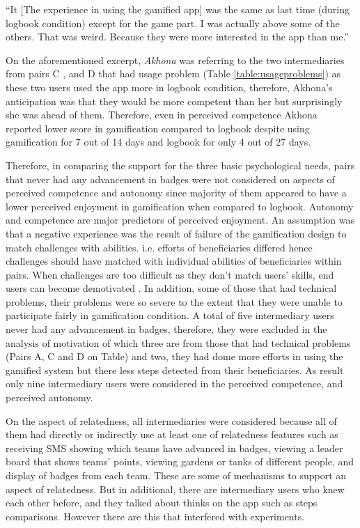  {``It [The experience in using the gamified app] was the same as last time (during logbook condition) except for the game part. I was actually above some of the others. That was weird. Because they were more interested in the app than me.''} 

On the aforementioned excerpt, \emph{Akhona} was referring to the two intermediaries from pairs C , and D that had usage problem (Table \ref{table:usageproblems}) as these two users used the app more in logbook condition, therefore, Akhona's anticipation was that they would be more competent than her but surprisingly she was ahead of them.  Therefore, even in perceived competence Akhona reported lower score in gamification compared to logbook despite using gamification for 7 out of 14 days and logbook for only 4 out of 27 days.

Therefore, in comparing the support for the three basic psychological needs, pairs that never had any advancement in badges were not considered on aspects of perceived competence and autonomy since majority of them appeared to have a lower perceived enjoyment in gamification when compared to logbook. Autonomy and competence are major predictors of perceived enjoyment. An assumption was that a negative experience was the result of failure of the gamification design to match challenges with abilities. i.e. efforts of beneficiaries differed hence challenges should have matched with individual abilities of beneficiaries within pairs. When challenges are too difficult as they don't match users' skills, end users can become demotivated \citep{zhang2008motivational}. In addition, some of those that had technical problems, their problems were so severe to the extent that they were unable to participate fairly in gamification condition. A total of five intermediary users never had any advancement in badges, therefore, they were excluded in the analysis of motivation of which three are from those that had technical problems (Pairs A, C and D on Table) and two, they had dome more efforts in using the gamified system but there less steps detected from their beneficiaries. As result only nine intermediary users were considered in the perceived competence, and perceived autonomy.

On the aspect of relatedness, all intermediaries were considered because all of them had directly or indirectly use at least one of relatedness features such as receiving SMS showing which teams have advanced in badges, viewing a leader board that shows teams' points, viewing gardens or tanks of different people, and display of badges from each team. These are some of mechanisms to support an aspect of relatedness\citep{sailer2013:psychological}. But in additional, there are intermediary users who knew each other before, and they talked about thinks on the app such as steps comparisons. However there are this that interfered with experiments.     
  
